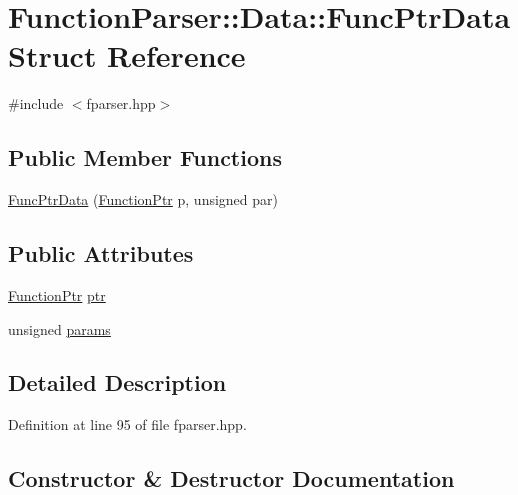 \hypertarget{struct_function_parser_1_1_data_1_1_func_ptr_data}{}\section{Function\+Parser\+:\+:Data\+:\+:Func\+Ptr\+Data Struct Reference}
\label{struct_function_parser_1_1_data_1_1_func_ptr_data}


{\ttfamily \#include $<$fparser.\+hpp$>$}

\subsection*{Public Member Functions}
\begin{DoxyCompactItemize}
\item 
\hyperlink{struct_function_parser_1_1_data_1_1_func_ptr_data_a9d9f4fac0438cd4cad8edb985c209252}{Func\+Ptr\+Data} (\hyperlink{class_function_parser_acca53651fb8f1c7a44e3d2cac7e62455}{Function\+Ptr} p, unsigned par)
\end{DoxyCompactItemize}
\subsection*{Public Attributes}
\begin{DoxyCompactItemize}
\item 
\hyperlink{class_function_parser_acca53651fb8f1c7a44e3d2cac7e62455}{Function\+Ptr} \hyperlink{struct_function_parser_1_1_data_1_1_func_ptr_data_a77521adad1c4cb850c9e439c72986a0c}{ptr}
\item 
unsigned \hyperlink{struct_function_parser_1_1_data_1_1_func_ptr_data_aa9389ca2450fe7dbc7618c624280da92}{params}
\end{DoxyCompactItemize}


\subsection{Detailed Description}


Definition at line 95 of file fparser.\+hpp.



\subsection{Constructor \& Destructor Documentation}
\mbox{\label{struct_function_parser_1_1_data_1_1_func_ptr_data_a9d9f4fac0438cd4cad8edb985c209252}} 
